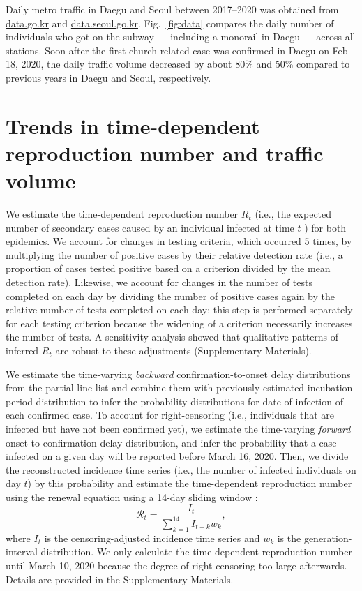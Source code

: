 \documentclass[12pt]{article}
\newcommand{\fref}[1]{Fig.~\ref{fig:#1}}
\begin{document}
Daily metro traffic in Daegu and Seoul between 2017--2020 was obtained from \url{data.go.kr} and \url{data.seoul.go.kr}.
\fref{data} compares the daily number of individuals who got on the subway --- including a monorail in Daegu --- across all stations.
Soon after the first church-related case was confirmed in Daegu on Feb 18, 2020, the daily traffic volume decreased by about 80\% and 50\% compared to previous years in Daegu and Seoul, respectively.


\section{Trends in time-dependent reproduction number and traffic volume}

We estimate the time-dependent reproduction number $R_t$ (i.e., the expected number of secondary cases caused by an individual infected at time $t$ \citep{fraser2007estimating}) for both epidemics.
We account for changes in testing criteria, which occurred 5 times, by multiplying the number of positive cases by their relative detection rate (i.e., a proportion of cases tested positive based on a criterion divided by the mean detection rate).
Likewise, we account for changes in the number of tests completed on each day by dividing the number of positive cases again by the relative number of tests completed on each day; this step is performed separately for each testing criterion because the widening of a criterion necessarily increases the number of tests.
A sensitivity analysis showed that qualitative patterns of inferred $R_t$ are robust to these adjustments (Supplementary Materials).

We estimate the time-varying \emph{backward} confirmation-to-onset delay distributions from the partial line list and combine them with previously estimated incubation period distribution \citep{backer2020incubation} to infer the probability distributions for date of infection of each confirmed case.
To account for right-censoring (i.e., individuals that are infected but have not been confirmed yet), we estimate the time-varying \emph{forward} onset-to-confirmation delay distribution, and infer the probability that a case infected on a given day will be reported before March 16, 2020.
Then, we divide the reconstructed incidence time series (i.e., the number of infected individuals on day $t$) by this probability and estimate the time-dependent reproduction number using the renewal equation using a 14-day sliding window \citep{fraser2007estimating}:
\begin{equation}
\mathcal R_t = \frac{I_t}{\sum_{k=1}^{14} I_{t-k} w_k},
\end{equation}
where $I_t$ is the censoring-adjusted incidence time series and $w_k$ is the generation-interval distribution.
We only calculate the time-dependent reproduction number until March 10, 2020 because the degree of right-censoring too large afterwards.
Details are provided in the Supplementary Materials.
\end{document}
